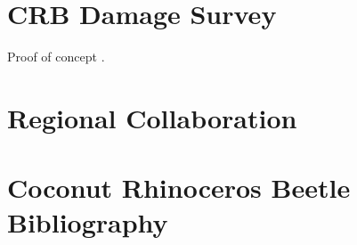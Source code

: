 \documentclass[12pt,letterpaper,english]{scrartcl}
\begin{document}
\newpage
\section{CRB Damage Survey}

Proof of concept \parencite{moore_training_2019}.

\newpage
\section{Regional Collaboration}

\cite{moore_coconut_2019}

\newpage
\printbibliography

\appendix


\newpage
\section{Coconut Rhinoceros Beetle Bibliography}
\end{document}
